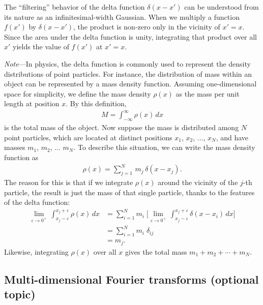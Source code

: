\documentclass[10pt,a4paper]{article}
\begin{document}
The ``filtering'' behavior of the delta function $\delta(x-x')$ can be
understood from its nature as an infinitesimal-width Gaussian. When we
multiply a function $f(x')$ by $\delta(x-x')$, the product is non-zero
only in the vicinity of $x' = x$. Since the area under the delta
function is unity, integrating that product over all $x'$ yields the
value of $f(x')$ at $x' = x$.

\begin{framed}\noindent
  \textit{Note}---In physics, the delta function is commonly used to
  represent the density distributions of point particles. For
  instance, the distribution of mass within an object can be
  represented by a mass density function.  Assuming one-dimensional
  space for simplicity, we define the mass density $\rho(x)$ as the
  mass per unit length at position $x$. By this definition,
  \begin{align}
    M = \int_{-\infty}^\infty \rho(x)\, dx
  \end{align}
  is the total mass of the object.  Now suppose the mass is distributed among $N$ point particles, which are located at distinct positions $x_1$, $x_2$, ..., $x_N$, and have masses $m_1$, $m_2$, ... $m_N$.  To describe this situation, we can write the mass density function as
  \begin{align}
    \rho(x) = \sum_{j=1}^N \, m_j\, \delta(x-x_j).
  \end{align}
  The reason for this is that if we integrate $\rho(x)$ around the
  vicinity of the $j$-th particle, the result is just the mass of that
  single particle, thanks to the features of the delta function:
  \begin{align}
    \lim_{\varepsilon\rightarrow 0^+}\, \int_{x_j - \varepsilon}^{x_j + \varepsilon} \rho(x) \, dx &= \sum_{i=1}^N m_i\; \Big[\lim_{\varepsilon\rightarrow 0^+}\, \int_{x_j - \varepsilon}^{x_j + \varepsilon} \delta(x-x_i) \,dx\Big]\\ &= \sum_{i=1}^N m_i\; \delta_{ij} \\ &= m_j.\end{align}
  Likewise, integrating $\rho(x)$ over all $x$ gives the total mass
  $m_1 + m_2 + \cdots + m_N$.
\end{framed}

\subsection{Multi-dimensional Fourier transforms (optional topic)}
\label{multi-dimensional-fourier-transforms}
\end{document}
